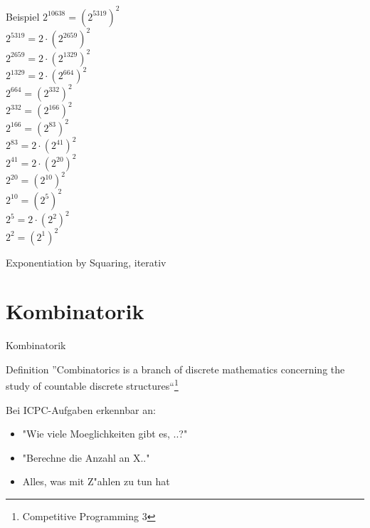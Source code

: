 \documentclass[18pt]{beamer}
\begin{document}
\begin{frame} {Beispiel}
$2^ {10638} = (2^{5319})^{2}  $ \\
$2^ {5319} = 2 \cdot (2^{2659})^{2}  $ \\
$2^ {2659} = 2 \cdot (2^{1329})^{2}  $ \\
$2^ {1329} = 2 \cdot (2^{664})^{2}  $ \\
$2^ {664} = (2^{332})^{2}  $ \\
$2^ {332} = (2^{166})^{2}  $ \\
$2^ {166} = (2^{83})^{2}  $ \\
$2^ {83} = 2 \cdot (2^{41})^{2}  $ \\
$2^ {41} = 2 \cdot (2^{20})^{2}  $ \\
$2^ {20} = (2^{10})^{2}  $ \\
$2^ {10} = (2^{5})^{2}  $ \\
$2^ {5} = 2 \cdot (2^{2})^{2}  $ \\
$2^ {2} = (2^{1})^{2}  $ \\
\end{frame}

\begin{frame} {Exponentiation by Squaring, iterativ}
\end{frame}




\section{Kombinatorik}


\begin{frame}{Kombinatorik}
\begin{block}{Definition}
	''Combinatorics is a branch of discrete mathematics concerning the study of countable discrete structures``\footnote{Competitive Programming 3}
\end{block}

Bei ICPC-Aufgaben erkennbar an:
\begin{itemize}
	\item "Wie viele Moeglichkeiten gibt es, ..?"
	\item "Berechne die Anzahl an X.."
	\item Alles, was mit Z"ahlen zu tun hat
\end{itemize}
\end{frame}
\end{document}
